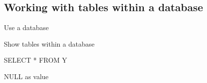 
\subsection{Working with tables within a database}

Use a database

Show tables within a database



SELECT * FROM Y

NULL as value